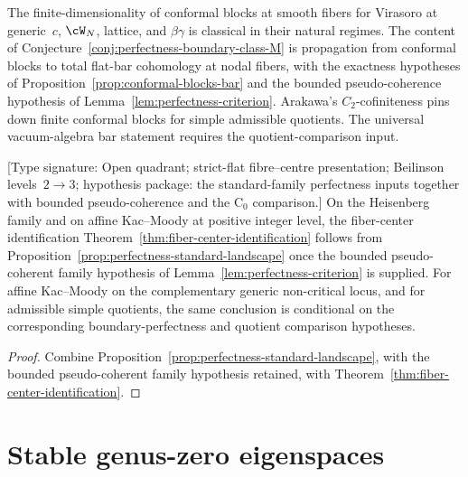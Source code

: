 \begin{remark}
\label{rem:perfectness-boundary-scope}%
The finite-dimensionality of conformal blocks at smooth fibers for
Virasoro at generic~$c$, $\cW_N$, lattice, and $\beta\gamma$ is
classical in their natural regimes.  The content of
Conjecture~\textup{\ref{conj:perfectness-boundary-class-M}} is
propagation from conformal blocks to total flat-bar cohomology at
nodal fibers, with the exactness hypotheses of
Proposition~\ref{prop:conformal-blocks-bar} and the bounded
pseudo-coherence hypothesis of
Lemma~\ref{lem:perfectness-criterion}.  Arakawa's
$C_2$-cofiniteness pins down finite conformal blocks for simple
admissible quotients. The universal vacuum-algebra bar statement
requires the quotient-comparison input.
\end{remark}

\begin{corollary}
\label{cor:c0-ordinary-class-G-L-locus}
\textup{[Type signature: Open quadrant; strict-flat fibre--centre
presentation; Beilinson levels~\(2\to3\); hypothesis package: the
standard-family perfectness inputs together with bounded
pseudo-coherence and the \(\mathrm C_0\) comparison.]}
On the Heisenberg family and on affine Kac--Moody at positive
integer level, the fiber-center identification
Theorem~\ref{thm:fiber-center-identification} follows from
Proposition~\ref{prop:perfectness-standard-landscape} once the
bounded pseudo-coherent family hypothesis of
Lemma~\ref{lem:perfectness-criterion} is supplied. For affine
Kac--Moody on the complementary generic non-critical locus, and for
admissible simple quotients, the same conclusion is
conditional on the corresponding boundary-perfectness and quotient
comparison hypotheses.
\end{corollary}

\begin{proof}
Combine
Proposition~\ref{prop:perfectness-standard-landscape}, with the
bounded pseudo-coherent family hypothesis retained, with
Theorem~\ref{thm:fiber-center-identification}.
\end{proof}

\section{Stable genus-zero eigenspaces}
\label{sec:theorem-C-g0}

